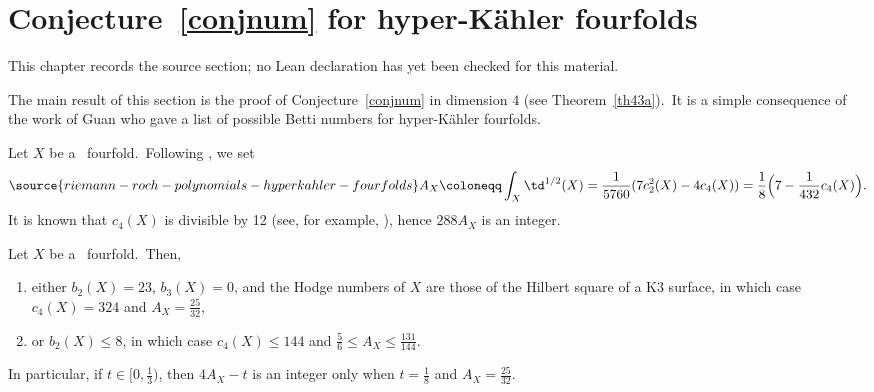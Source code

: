 \chapter{Conjecture~\ref{conjnum} for hyper-K\"ahler fourfolds}
\label{riemann-roch-polynomials-hyperkahler-fourfolds-chapter-04}

\begin{remark}
\label{riemann-roch-polynomials-hyperkahler-fourfolds-chapter-04-source}
This chapter records the source section; no Lean declaration has yet been checked for this material.
\notready
\end{remark}

\label{sec:IsotropicClasses}

The main result of  this section is the proof of  Conjecture~\ref{conjnum} in dimension $4$ (see Theorem~\ref{th43a}).\ It is a simple consequence of the work \cite{gua} of Guan  who gave a list of possible Betti numbers for hyper-K\"ahler fourfolds.

Let $X$ be a \hk\ fourfold.\ Following \cite[Section~2.4]{jia}, we
 set
\begin{equation}\label{ax}
\source{riemann-roch-polynomials-hyperkahler-fourfolds}
A_X\coloneqq\int_X\td^{1/2}(X)= \frac 1 {5760} ( 7c_2^2(X) -4c_4(X) ) = \frac 18 \Bigl(7-\frac 1 {432} c_4(X)\Bigr).
\end{equation}
It is known that $c_4(X)$ is divisible by 12 (see, for example, \cite[Proposition 2.4]{gr}), hence $288 A_X$ is an integer.

\begin{lemm}\label{lemmguan}
Let $X$ be a \hk\ fourfold.\ Then,
\begin{enumerate}[{\rm (a)}]
\item\label{aax} either $b_2(X) =23$,  $b_3(X) =0$, and the Hodge numbers of $X$ are those of the Hilbert square of a K3 surface, in which case $ c_4(X)= 324$ and $A_X=\frac{25}{32}$,
\item\label{bax} or $b_2(X) \le 8$, in which case $c_4(X)\le 144$ and  $\frac{5}{6}\le A_X\le \frac{131}{144}$.
 \end{enumerate}
In particular, if $t\in [0,\frac13)$, then $4A_X-t $ is an integer only when $t=\frac18$ and $A_X=\frac{25}{32}$.
\end{lemm}

